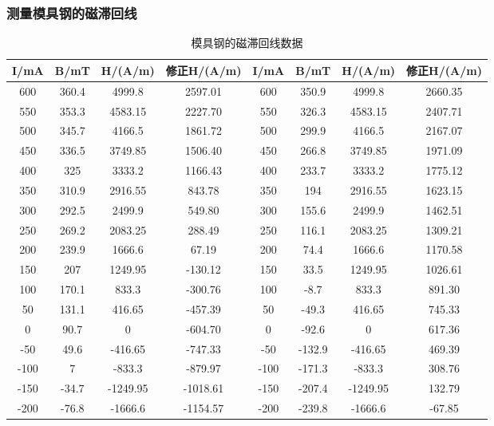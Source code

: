 \documentclass[UTF-8,twoside,cs4size]{ctexart}
\begin{document}
\subsubsection{测量模具钢的磁滞回线}
\begin{table}[htbp]
    \centering
    \caption{模具钢的磁滞回线数据}
    \begin{tabular}{|c|c|c|c|c|c|c|c|}
    \hline
    I/mA & B/mT & H/(A/m) & 修正H/(A/m) & I/mA & B/mT & H/(A/m) & 修正H/(A/m) \\ \hline
    600  & 360.4  & 4999.8  & 2597.01  & 600  & 350.9  & 4999.8  & 2660.35  \\ \hline
    550  & 353.3  & 4583.15 & 2227.70  & 550  & 326.3  & 4583.15 & 2407.71  \\ \hline
    500  & 345.7  & 4166.5  & 1861.72  & 500  & 299.9  & 4166.5  & 2167.07  \\ \hline
    450  & 336.5  & 3749.85 & 1506.40  & 450  & 266.8  & 3749.85 & 1971.09  \\ \hline
    400  & 325    & 3333.2  & 1166.43  & 400  & 233.7  & 3333.2  & 1775.12  \\ \hline
    350  & 310.9  & 2916.55 & 843.78   & 350  & 194    & 2916.55 & 1623.15  \\ \hline
    300  & 292.5  & 2499.9  & 549.80   & 300  & 155.6  & 2499.9  & 1462.51  \\ \hline
    250  & 269.2  & 2083.25 & 288.49   & 250  & 116.1  & 2083.25 & 1309.21  \\ \hline
    200  & 239.9  & 1666.6  & 67.19    & 200  & 74.4   & 1666.6  & 1170.58  \\ \hline
    150  & 207    & 1249.95 & -130.12  & 150  & 33.5   & 1249.95 & 1026.61  \\ \hline
    100  & 170.1  & 833.3   & -300.76  & 100  & -8.7   & 833.3   & 891.30   \\ \hline
    50   & 131.1  & 416.65  & -457.39  & 50   & -49.3  & 416.65  & 745.33   \\ \hline
    0    & 90.7   & 0       & -604.70  & 0    & -92.6  & 0       & 617.36   \\ \hline
    -50  & 49.6   & -416.65 & -747.33  & -50  & -132.9 & -416.65 & 469.39   \\ \hline
    -100 & 7      & -833.3  & -879.97  & -100 & -171.3 & -833.3  & 308.76   \\ \hline
    -150 & -34.7  & -1249.95& -1018.61 & -150 & -207.4 & -1249.95& 132.79   \\ \hline
    -200 & -76.8   & -1666.6 & -1154.57 & -200 & -239.8 & -1666.6 & -67.85   \\ \hline

\end{tabular}
\end{table}
\end{document}
